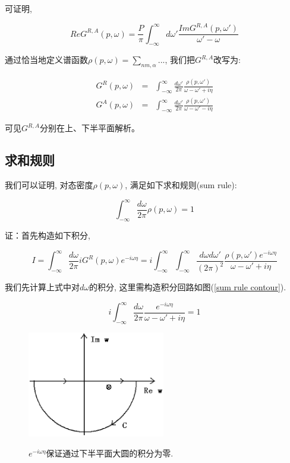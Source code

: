 可证明,

\begin{equation*}
Re G^{R,A}(p, \omega) = \frac{P}{\pi} \int_{-\infty}^{\infty}
d\omega' \frac{Im G^{R,A} (p, \omega')}{ \omega' - \omega}
\end{equation*}

通过恰当地定义谱函数$\rho(p, \omega) = \sum_{nm,\alpha}...$,
我们把$G^{R,A}$改写为:

\begin{eqnarray*}
  G^R (p, \omega) &=& \int_{-\infty}^{\infty} \frac{d\omega'}{2 \pi} \frac{\rho(p, \omega')}{\omega - \omega' + i\eta } \\
  G^A (p, \omega) &=& \int_{-\infty}^{\infty} \frac{d\omega'}{2 \pi} \frac{\rho(p, \omega')}{\omega - \omega' - i\eta }
\end{eqnarray*}

可见$G^{R,A}$分别在上、下半平面解析。


\subsection{求和规则}

我们可以证明, 对态密度$\rho(p, \omega)$, 满足如下求和规则(sum rule):

\begin{equation}\label{sum rule}
\int_{-\infty}^{\infty} \frac{d \omega}{2 \pi} \rho(p, \omega) = 1
\end{equation}

证：首先构造如下积分,

\begin{equation*}
I = \int_{-\infty}^{\infty} \frac{d \omega}{2 \pi} i G^R(p, \omega)
e^{-i \omega \eta} = i \int_{-\infty}^{\infty}
\int_{-\infty}^{\infty} \frac{d \omega d \omega'}{(2\pi)^2}
\frac{\rho(p, \omega') e^{-i\omega \eta}}{\omega - \omega' + i \eta}
\end{equation*}

我们先计算上式中对$d \omega$的积分, 这里需构造积分回路如图(\ref{sum
rule contour}).

\begin{equation*}
i \int_{-\infty}^{\infty}\frac{d\omega}{2\pi}\frac{e^{-i \omega
\eta}}{\omega - \omega' + i \eta} =1
\end{equation*}

\begin{figure}[h]
\begin{center}
  \includegraphics[width=6cm]{Finite/sum-rule-contour.ps}\\
  \caption{$e^{-i \omega \eta}$保证通过下半平面大圆的积分为零.}\label{sum rule contour}
\end{center}
\end{figure}

